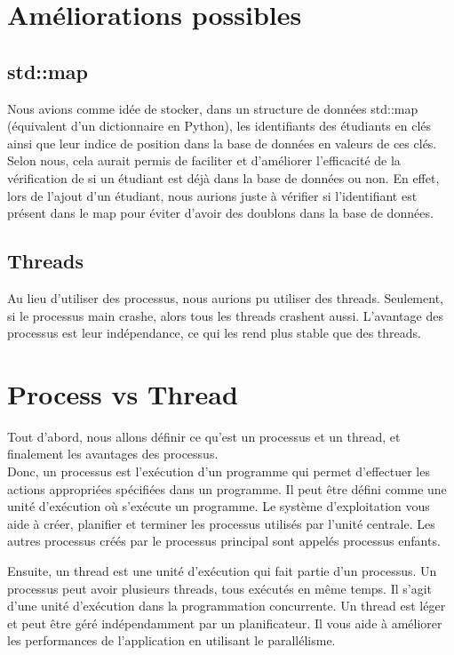 \documentclass[utf8]{article}
\begin{document}
\section{Améliorations possibles}
    \subsection{std::map}
    \indent{}
\par
    Nous avions comme idée de stocker, dans un structure de données std::map (équivalent d'un dictionnaire en Python), les identifiants des étudiants en clés ainsi que leur indice de position dans la base de données en valeurs de ces clés. \newline
    Selon nous, cela aurait permis de faciliter et d'améliorer l'efficacité de la vérification de si un étudiant est déjà dans la base de données ou non. \newline En effet, lors de l'ajout d'un étudiant, nous aurions juste à vérifier si l'identifiant est présent dans le map pour éviter d'avoir des doublons dans la base de données.
    \subsection{Threads}
    \indent{}
    \par
    Au lieu d'utiliser des processus, nous aurions pu utiliser des threads. Seulement, si le processus main crashe,
    alors tous les threads crashent aussi. L'avantage des processus est leur indépendance, ce qui les rend plus stable que des threads.\\
\section{Process vs Thread}
\par
Tout d'abord, nous allons définir ce qu'est un processus et un thread, et finalement les avantages des processus.\\

Donc, un processus est l'exécution d'un programme qui permet d'effectuer les actions appropriées spécifiées dans un programme. Il peut être défini comme une unité d'exécution où s'exécute un programme. Le système d'exploitation vous aide à créer, planifier et terminer les processus utilisés par l'unité centrale. Les autres processus créés par le processus principal sont appelés processus enfants.

Ensuite, un thread est une unité d'exécution qui fait partie d'un processus. Un processus peut avoir plusieurs threads, tous exécutés en même temps. Il s'agit d'une unité d'exécution dans la programmation concurrente. Un thread est léger et peut être géré indépendamment par un planificateur. Il vous aide à améliorer les performances de l'application en utilisant le parallélisme.
\end{document}
